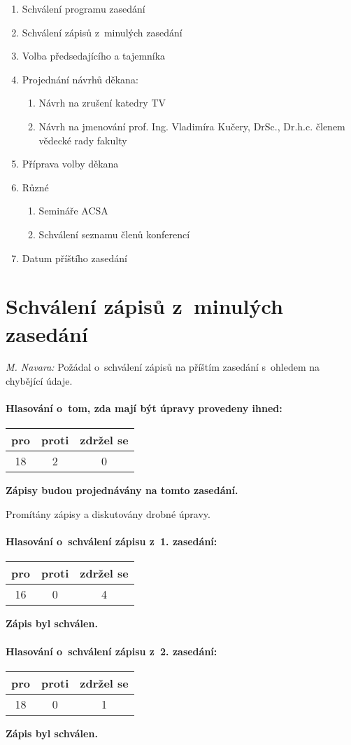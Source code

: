 \documentclass[a4paper,12pt,notitlepage,oneside]{article}
\newcommand{\hlasovani}[3]{\begin{center}
\begin{tabular}{|c|c|c|}\hline
pro& proti & zdržel se \\ \hline
#1 & #2 & #3 \\ \hline
\end{tabular}
\end{center}}
\begin{document}
\renewcommand{\labelenumii}{\alph{enumii})}
\begin{enumerate}
\item Schválení programu zasedání
\item Schválení zápisů z~minulých zasedání
\item Volba předsedajícího a tajemníka
\item Projednání návrhů děkana:
	\begin{enumerate}
	\item Návrh na zrušení katedry TV
	\item Návrh na jmenování prof. Ing. Vladimíra Kučery, DrSc., Dr.h.c. členem vědecké rady fakulty
	\end{enumerate}
\item Příprava volby děkana
\item Různé
	\begin{enumerate}
	\item Semináře ACSA
	\item Schválení seznamu členů konferencí
	\end{enumerate}
\item Datum příštího zasedání
\end{enumerate}



\section{Schválení zápisů z~minulých zasedání}

\textit{M. Navara:} Požádal o~schválení zápisů na příštím zasedání s~ohledem na chybějící údaje.

\paragraph{Hlasování o~tom, zda mají být úpravy provedeny ihned:}
\hlasovani{18}{2}{0}
\textbf{Zápisy budou projednávány na tomto zasedání.}

\vskip 12pt
\noindent Promítány zápisy a diskutovány drobné úpravy.

\paragraph{Hlasování o~schválení zápisu z~1. zasedání:}
\hlasovani{16}{0}{4}
\textbf{Zápis byl schválen.}

\paragraph{Hlasování o~schválení zápisu z~2. zasedání:}
\hlasovani{18}{0}{1}
\textbf{Zápis byl schválen.}
\end{document}
